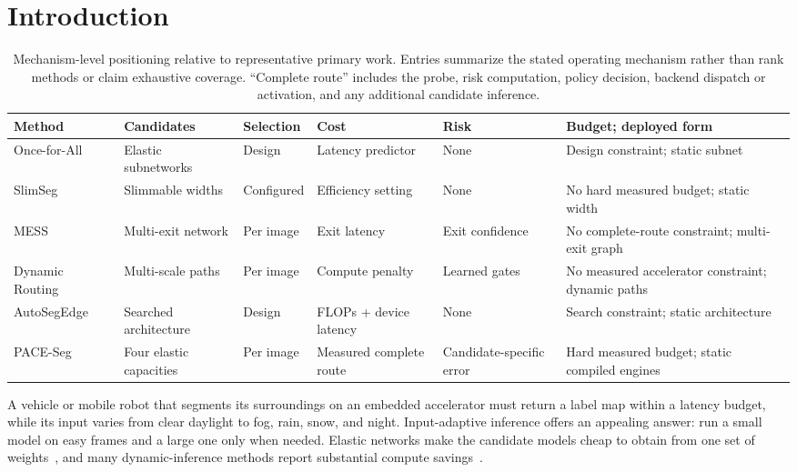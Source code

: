 \documentclass[a4paper,5p]{elsarticle}
\newcommand{\method}{PACE-Seg}
\begin{document}
\section{Introduction}
\label{sec:introduction}

\begin{table}[!t]
\centering
\caption{Mechanism-level positioning relative to representative primary work. Entries summarize the stated operating mechanism rather than rank methods or claim exhaustive coverage. ``Complete route'' includes the probe, risk computation, policy decision, backend dispatch or activation, and any additional candidate inference.}
\label{tab:related-positioning}
\footnotesize
\setlength{\tabcolsep}{4pt}
\begin{tabularx}{\textwidth}{@{}lllll>{\raggedright\arraybackslash}X@{}}
\toprule
Method & Candidates & Selection & Cost & Risk & Budget; deployed form \\
\midrule
Once-for-All~\cite{cai2020ofa} & Elastic subnetworks & Design & Latency predictor & None & Design constraint; static subnet \\
SlimSeg~\cite{xue2022slimseg} & Slimmable widths & Configured & Efficiency setting & None & No hard measured budget; static width \\
MESS~\cite{kouris2022mess} & Multi-exit network & Per image & Exit latency & Exit confidence & No complete-route constraint; multi-exit graph \\
Dynamic Routing~\cite{li2020dynamic} & Multi-scale paths & Per image & Compute penalty & Learned gates & No measured accelerator constraint; dynamic paths \\
AutoSegEdge~\cite{dou2023autosegedge} & Searched architecture & Design & FLOPs + device latency & None & Search constraint; static architecture \\
\method{} & Four elastic capacities & Per image & Measured complete route & Candidate-specific error & Hard measured budget; static compiled engines \\
\bottomrule
\end{tabularx}
\end{table}

A vehicle or mobile robot that segments its surroundings on an embedded accelerator must return a label map within a latency budget, while its input varies from clear daylight to fog, rain, snow, and night. Input-adaptive inference offers an appealing answer: run a small model on easy frames and a large one only when needed. Elastic networks make the candidate models cheap to obtain from one set of weights~\cite{yu2019usnet,cai2020ofa}, and many dynamic-inference methods report substantial compute savings~\cite{han2022dynamic}.
\end{document}
